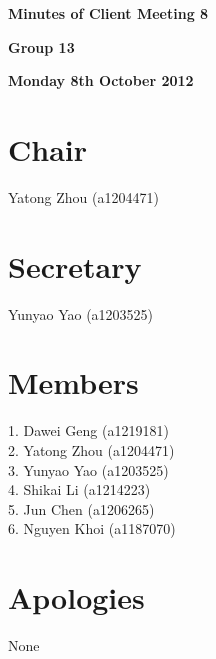 \documentclass[11pt, a4paper]{article}
\begin{document}
 



\vspace*{15pt}

\begin{center}
\huge \bf Minutes of Client Meeting 8
\end{center}


\begin{center}
\Large \bf Group 13
\end{center}

\begin{center}
\Large \bf Monday 8th October 2012
\end{center}

\section*{Chair}
Yatong Zhou (a1204471)

\section*{Secretary}
Yunyao Yao (a1203525)

\section*{Members}
1. Dawei Geng (a1219181)\\
2. Yatong Zhou (a1204471)\\
3. Yunyao Yao (a1203525)\\
4. Shikai Li (a1214223)\\
5. Jun Chen (a1206265)\\
6. Nguyen Khoi (a1187070)
\vspace*{10pt}

\section*{Apologies}
None
\end{document}
